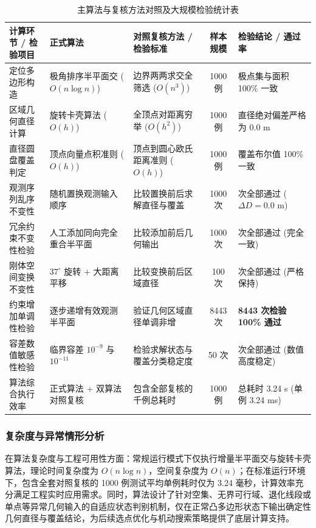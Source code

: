 \documentclass[zihao=-4,a4paper,UTF8]{ctexart}
\begin{document}
\begin{table}[!ht]
    \centering
    \small
    \caption{主算法与复核方法对照及大规模检验统计表}
    \label{tab:q1_verification_methods}
    \renewcommand{\arraystretch}{1.08}
    \begin{tabularx}{\linewidth}{>{\raggedright\arraybackslash}p{2.6cm} X X c >{\raggedright\arraybackslash}p{3.0cm}}
        \toprule[1.5pt]
        \textbf{计算环节 / 检验项目} & \textbf{正式算法} & \textbf{对照复核方法 / 检验标准} & \textbf{样本规模} & \textbf{检验结论 / 通过率} \\
        \midrule
        定位多边形构造 & 极角排序半平面交 ($O(n\log n)$) & 边界两两求交全筛选 ($O(n^3)$) & 1000 例 & 极点集与面积 100\% 一致 \\
        区域几何直径计算 & 旋转卡壳算法 ($O(h)$) & 全顶点对距离穷举 ($O(h^2)$) & 1000 例 & 直径绝对偏差严格为 $0.0\text{ m}$ \\
        直径圆盘覆盖判定 & 顶点向量点积准则 ($O(h)$) & 顶点到圆心欧氏距离准则 ($O(h)$) & 1000 例 & 覆盖布尔值 100\% 一致 \\
        观测序列乱序不变性 & 随机置换观测输入顺序 & 比较置换前后求解直径与覆盖 & 1000 次 & 1000 次全部通过 ($\Delta D = 0.0\text{ m}$) \\
        冗余约束不变性检验 & 人工添加同向完全重合半平面 & 比较添加前后几何输出 & 1000 次 & 1000 次全部通过 (完全一致) \\
        刚体空间变换不变性 & $37^\circ$ 旋转 + 大距离平移 & 比较变换前后区域直径 & 100 次 & 100 次全部通过 (严格保持) \\
        约束增加单调性检验 & 逐步递增有效观测半平面 & 验证几何区域直径单调非增 & 8443 次 & \textbf{8443 次检验 100\% 通过} \\
        容差数值敏感性检验 & 临界容差 $10^{-9}$ 与 $10^{-11}$ & 检验求解状态与覆盖分类稳定度 & 50 次 & 50 次全部通过 (数值高度稳定) \\
        算法综合执行效率 & 正式算法 + 双算法对照复核 & 包含全部复核的千例总耗时 & 1000 例 & 总耗时 3.24 s (单例 3.24 ms) \\
        \bottomrule[1.5pt]
    \end{tabularx}
\end{table}

\subsubsection{复杂度与异常情形分析}

在算法复杂度与工程可用性方面：常规运行模式下仅执行增量半平面交与旋转卡壳算法，理论时间复杂度为 $O(n\log n)$，空间复杂度为 $O(n)$；在标准运行环境下，包含全套对照复核的 1000 例测试平均单例耗时仅为 3.24 毫秒，计算效率充分满足工程实时应用需求。同时，算法设计了针对空集、无界可行域、退化线段或单点等异常几何输入的自适应状态判别机制，仅在正常凸多边形状态下输出确定性几何直径与覆盖结论，为后续选点优化与机动搜索策略提供了底层计算支持。
\end{document}
